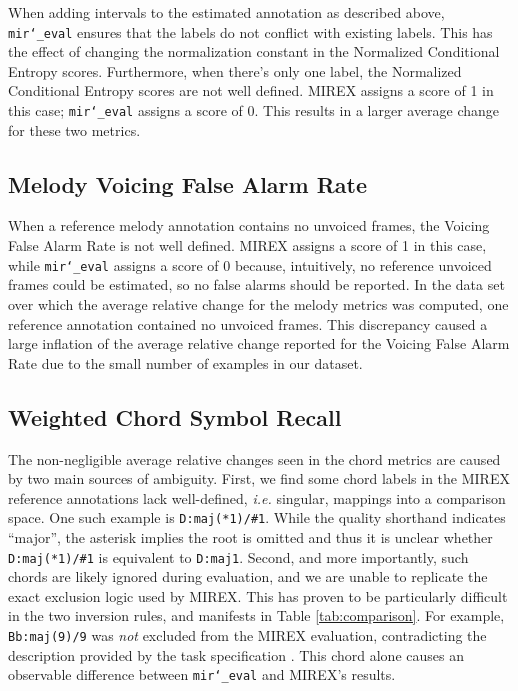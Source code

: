 \documentclass{article}
\def\ie{\emph{i.e.}}
\def\mireval{\texttt{mir\char`_eval}}
\begin{document}
When adding intervals to the estimated annotation as described above, \mireval{} ensures that the labels do not conflict with existing labels.
This has the effect of changing the normalization constant in the Normalized Conditional Entropy scores.
Furthermore, when there's only one label, the Normalized Conditional Entropy scores are not well defined.
MIREX assigns a score of 1 in this case; \mireval{} assigns a score of 0.
This results in a larger average change for these two metrics.

\subsection{Melody Voicing False Alarm Rate}

When a reference melody annotation contains no unvoiced frames, the Voicing False Alarm Rate is not well defined.
MIREX assigns a score of 1 in this case, while \mireval{} assigns a score of 0 because, intuitively, no reference unvoiced frames could be estimated, so no false alarms should be reported.
In the data set over which the average relative change for the melody metrics was computed, one reference annotation contained no unvoiced frames.
This discrepancy caused a large inflation of the average relative change reported for the Voicing False Alarm Rate due to the small number of examples in our dataset.

\subsection{Weighted Chord Symbol Recall}
The non-negligible average relative changes seen in the chord metrics are caused by two main sources of ambiguity.
First, we find some chord labels in the MIREX reference annotations lack well-defined, \ie{} singular, mappings into a comparison space. 
One such example is \texttt{D:maj(*1)/\#1}.
While the quality shorthand indicates ``major'', the asterisk implies the root is omitted and thus it is unclear whether \texttt{D:maj(*1)/\#1} is equivalent to \texttt{D:maj1}.
Second, and more importantly, such chords are likely ignored during evaluation, and we are unable to replicate the exact exclusion logic used by MIREX.
This has proven to be particularly difficult in the two inversion rules, and manifests in Table \ref{tab:comparison}. 
For example, \texttt{Bb:maj(9)/9} was \emph{not} excluded from the MIREX evaluation, contradicting the description provided by the task specification \cite{choi2013mirex}.
This chord alone causes an observable difference between \mireval{} and MIREX's results.
\end{document}

